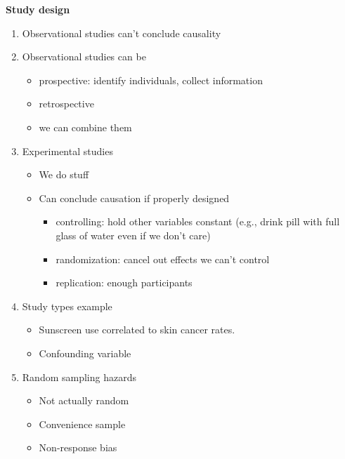 \textbf{Study design}
\begin{enumerate}
\item Observational studies can't conclude causality
\item Observational studies can be
  \begin{itemize}
  \item prospective: identify individuals, collect information
  \item retrospective
  \item we can combine them
  \end{itemize}
\item Experimental studies
  \begin{itemize}
  \item We do stuff
  \item Can conclude causation if properly designed
    \begin{itemize}
    \item controlling: hold other variables constant (e.g., drink pill
      with full glass of water even if we don't care)
    \item randomization: cancel out effects we can't control
    \item replication: enough participants
    \end{itemize}
  \end{itemize}
\item Study types example
  \begin{itemize}
  \item Sunscreen use correlated to skin cancer rates.
  \item Confounding variable
  \end{itemize}
\item Random sampling hazards
  \begin{itemize}
  \item Not actually random
  \item Convenience sample
  \item Non-response bias
  \end{itemize}
\end{enumerate}

